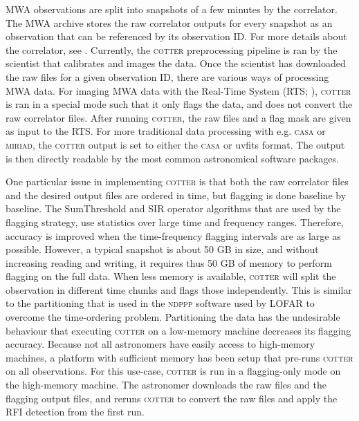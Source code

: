 \documentclass{pasa}
\begin{document}
MWA observations are split into snapshots of a few minutes by the correlator. The MWA archive stores the raw correlator outputs for every snapshot as an observation that can be referenced by its observation ID. For more details about the correlator, see \citet{ord-2014-mwa-fpga-gpu}. Currently, the \textsc{cotter} preprocessing pipeline is ran by the scientist that calibrates and images the data. Once the scientist has downloaded the raw files for a given observation ID, there are various ways of processing MWA data. For imaging MWA data with the Real-Time System (RTS; \citealt{rts-mwa-2008}), \textsc{cotter} is ran in a special mode such that it only flags the data, and does not convert the raw correlator files. After running \textsc{cotter}, the raw files and a flag mask are given as input to the RTS. For more traditional data processing with e.g. \textsc{casa} or \textsc{miriad}, the \textsc{cotter} output is set to either the \textsc{casa} or uvfits format. The output is then directly readable by the most common astronomical software packages.

One particular issue in implementing \textsc{cotter} is that both the raw correlator files and the desired output files are ordered in time, but flagging is done baseline by baseline. The SumThreshold and SIR operator algorithms that are used by the flagging strategy, use statistics over large time and frequency ranges. Therefore, accuracy is improved when the time-frequency flagging intervals are as large as possible. However, a typical snapshot is about 50 GB in size, and without increasing reading and writing, it requires thus 50 GB of memory to perform flagging on the full data. When less memory is available, \textsc{cotter} will split the observation in different time chunks and flags those independently. This is similar to the partitioning that is used in the \textsc{ndppp} software used by LOFAR \citep{lofar-imaging-cookbook} to overcome the time-ordering problem. Partitioning the data has the undesirable behaviour that executing \textsc{cotter} on a low-memory machine decreases its flagging accuracy. Because not all astronomers have easily access to high-memory machines, a platform with sufficient memory has been setup that pre-runs \textsc{cotter} on all observations. For this use-case, \textsc{cotter} is run in a flagging-only mode on the high-memory machine. The astronomer downloads the raw files and the flagging output files, and reruns \textsc{cotter} to convert the raw files and apply the RFI detection from the first run.
\end{document}
